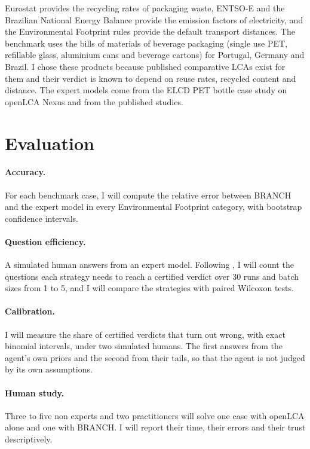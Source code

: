 \documentclass{article}
\begin{document}
Eurostat provides the recycling rates of packaging waste,
ENTSO-E and the Brazilian National Energy Balance provide the emission factors of electricity, and the
Environmental Footprint rules provide the default transport distances. The benchmark uses the bills of
materials of beverage packaging (single use PET, refillable glass, aluminium cans and beverage cartons)
for Portugal, Germany and Brazil. I chose these products because published comparative LCAs exist for
them and their verdict is known to depend on reuse rates, recycled content and distance. The expert
models come from the ELCD PET bottle case study on openLCA Nexus and from the published studies.

\section{Evaluation}
\paragraph{Accuracy.} For each benchmark case, I will compute the relative error between BRANCH and the
expert model in every Environmental Footprint category, with bootstrap confidence intervals.

\paragraph{Question efficiency.} A simulated human answers from an expert model. Following
\citet{faria2022}, I will count the questions each strategy needs to reach a certified verdict over 30
runs and batch sizes from 1 to 5, and I will compare the strategies with paired Wilcoxon tests.

\paragraph{Calibration.} I will measure the share of certified verdicts that turn out wrong, with exact
binomial intervals, under two simulated humans. The first answers from the agent's own priors and the second
from their tails, so that the agent is not judged by its own assumptions.

\paragraph{Human study.} Three to five non experts and two practitioners will solve one case with openLCA
alone and one with BRANCH. I will report their time, their errors and their trust descriptively.
\end{document}
